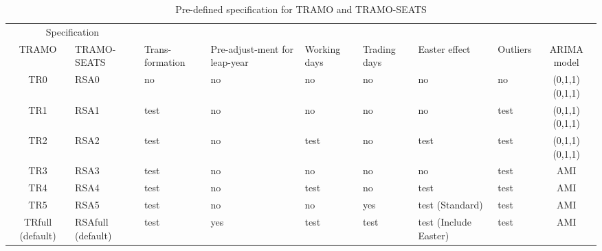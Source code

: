 \documentclass[article]{jss}
\begin{document}
\begin{table}[t]

\caption{\label{tab:pre_def_ts}Pre-defined specification for TRAMO and TRAMO-SEATS}
\centering
\fontsize{7}{9}\selectfont
\begin{tabular}{c>{\centering\arraybackslash}p{}>{\centering\arraybackslash}p{}>{\centering\arraybackslash}p{1.5cm}>{\centering\arraybackslash}p{0.9cm}>{\centering\arraybackslash}p{0.9cm}>{\centering\arraybackslash}p{1.5cm}>{\centering\arraybackslash}p{0.9cm}c}
\toprule
\multicolumn{2}{c}{Specification} & \multicolumn{1}{c}{} \\
\cmidrule(l{3pt}r{3pt}){1-2}
TRAMO & TRAMO-SEATS & Trans-formation & Pre-adjust-ment for leap-year & Working days & Trading days & Easter effect & Outliers & ARIMA model\\
\midrule
TR0 & RSA0 & no & no & no & no & no & no & (0,1,1)(0,1,1)\\
TR1 & RSA1 & test & no & no & no & no & test & (0,1,1)(0,1,1)\\
TR2 & RSA2 & test & no & test & no & test & test & (0,1,1)(0,1,1)\\
TR3 & RSA3 & test & no & no & no & no & test & AMI\\
TR4 & RSA4 & test & no & test & no & test & test & AMI\\
\addlinespace
TR5 & RSA5 & test & no & no & yes & test (Standard) & test & AMI\\
TRfull (default) & RSAfull (default) & test & yes & test & test & test (Include Easter) & test & AMI\\
\bottomrule
\end{tabular}
\end{table}
\end{document}
